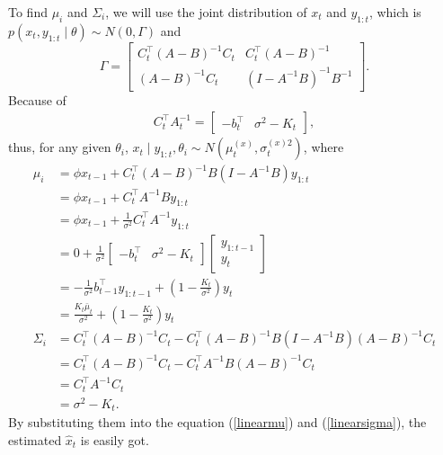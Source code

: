 To find $\mu_i$ and $\Sigma_i$, we will use the joint distribution of $x_{t}$ and $y_{1:t}$, which is $p\left(x_{t}, y_{1:t}  \mid  \theta\right)\sim N\left(0,\Gamma\right)$ and 
\begin{equation*}
\Gamma=\begin{bmatrix} C_{t}^\top\left(A-B\right)^{-1}C_{t} & C_{t}^\top\left(A-B\right)^{-1}\\\left(A-B\right)^{-1}C_{t} & \left(I-A^{-1}B\right)^{-1}B^{-1} \end{bmatrix}.
\end{equation*}
Because of 
\begin{align*}
C_{t}^\top A_{t}^{-1} = \begin{bmatrix} - b_{t}^\top & \sigma^2- K_{t} \end{bmatrix},
\end{align*}
thus, for any given $\theta_i$, $x_{t}\mid y_{1:t},\theta_i \sim N\left(\mu_{t}^{\left(x\right)},\sigma_{t}^{\left(x\right)2}\right)$, where
\begin{align*}
\mu_i  &= \phi \hat{x}_{t-1} +  C_{t}^\top \left(A-B\right)^{-1}B \left(I-A^{-1}B\right)y_{1:t}\\
                      &= \phi \hat{x}_{t-1} +  C_{t}^\top A^{-1}B y_{1:t} \\ &= \phi \hat{x}_{t-1} +  \frac{1}{\sigma^2}C_{t}^\top A^{-1} y_{1:t}\\
                      &=0+  \frac{1}{\sigma^2}\begin{bmatrix} - b_{t}^\top & \sigma^2- K_{t} \end{bmatrix} \begin{bmatrix} y_{1:t-1} \\ y_{t} \end{bmatrix}  \\
                      &= - \frac{1}{\sigma^2}b_{t-1}^\top y_{1:t-1}+\left(1-\frac{K_{t}}{\sigma^2}\right)y_{t}\\
                      &=\frac{K_{t}\bar{\mu}_{t}}{\sigma^2}+\left(1-\frac{K_{t}}{\sigma^2}\right)y_{t} \\
\Sigma_i&=C_{t}^\top\left(A-B\right)^{-1}C_{t}-  C_{t}^\top\left(A-B\right)^{-1}  B\left(I-A^{-1}B\right) \left(A-B\right)^{-1}C_{t}\\
                      &= C_{t}^\top\left(A-B\right)^{-1}C_{t} -  C_{t}^\top A^{-1}B\left(A-B\right)^{-1}C_{t}\\
                      &= C_{t}^\top A^{-1}C_{t} \\ &= \sigma^2-K_{t}.
\end{align*}
By substituting them into the equation (\ref{linearmu}) and (\ref{linearsigma}), the estimated $\hat{x}_t$ is easily got. 



